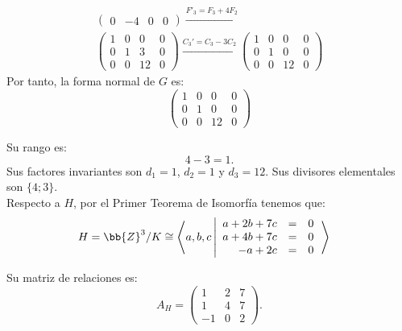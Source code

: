 \begin{ejercicio}
\begin{enumerate}
\begin{multline*}
\begin{pmatrix}
                0 & -4 & 0 & 0
            \end{pmatrix}
            \xrightarrow{F'_3=F_3+4F_2}\\
            \begin{pmatrix}
                1 & 0 & 0 & 0 \\
                0 & 1 & 3 & 0 \\
                0 & 0 & 12 & 0
            \end{pmatrix}
            \xrightarrow{C_3'=C_3-3C_2}
            \begin{pmatrix}
                1 & 0 & 0 & 0 \\
                0 & 1 & 0 & 0 \\
                0 & 0 & 12 & 0
            \end{pmatrix}
        \end{multline*}
        Por tanto, la forma normal de $G$ es:
        \begin{equation*}
            \begin{pmatrix}
                1 & 0 & 0 & 0 \\
                0 & 1 & 0 & 0 \\
                0 & 0 & 12 & 0
            \end{pmatrix}
        \end{equation*}

        Su rango es:
        \begin{equation*}
            4-3= 1.
        \end{equation*}
        Sus factores invariantes son $d_1=1$, $d_2=1$ y $d_3=12$.
        Sus divisores elementales son $\{  4; 3\}$.\\

        Respecto a $H$, por el Primer Teorema de Isomorfía tenemos que:
        \begin{align*}
            H= \bb{Z}^3/K &\cong \left\langle a,b,c \left|
                \begin{array}{rcl}
                    a + 2b + 7c &=& 0 \\
                    a + 4b + 7c &=& 0 \\
                    -a + 2c &=& 0
                \end{array}
            \right.\right\rangle
        \end{align*}

        Su matriz de relaciones es:
        \begin{equation*}
            A_H = \begin{pmatrix}
                1 & 2 & 7 \\
                1 & 4 & 7 \\
                -1 & 0 & 2
            \end{pmatrix}.
        \end{equation*}


\end{enumerate}
\end{ejercicio}

